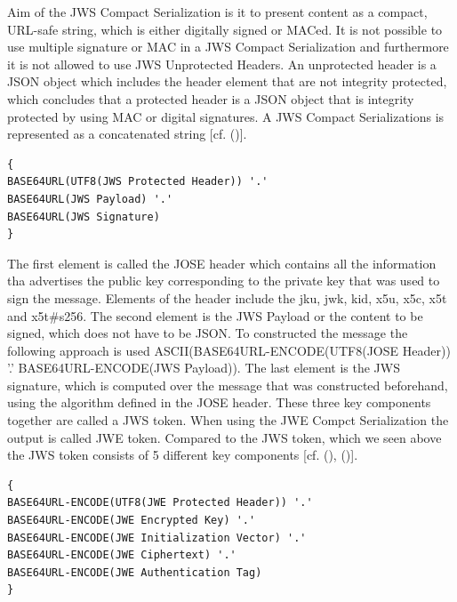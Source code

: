 {{{Aim of the JWS Compact Serialization is it to present content as a compact, URL-safe string, which is either digitally signed or MACed. It is not possible to use multiple signature or MAC in a JWS Compact Serialization and furthermore it is not allowed to use JWS Unprotected Headers. An unprotected header is a JSON object which includes the header element that are not integrity protected, which concludes that a protected header is a JSON object that is integrity protected by using MAC or digital signatures. A JWS Compact Serializations is represented as a concatenated string [cf. (\cite{JWS:IETF:Jones:2015})].

\begin{lstlisting}
{
BASE64URL(UTF8(JWS Protected Header)) '.'
BASE64URL(JWS Payload) '.'
BASE64URL(JWS Signature)
}
\end{lstlisting}

The first element is called the JOSE header which contains all the information tha advertises the public key corresponding to the private key that was used to sign the message. Elements of the header include the jku, jwk, kid, x5u, x5c, x5t and x5t\#s256. The second element is the JWS Payload or the content to be signed, which does not have to be JSON. To constructed the message the following approach is used  ASCII(BASE64URL-ENCODE(UTF8(JOSE Header)) '.' BASE64URL-ENCODE(JWS Payload)). 
The last element is the JWS signature, which is computed over the message that was constructed beforehand, using the algorithm defined in the JOSE header. These three key components together are called a JWS token. When using the JWE Compct Serialization the output is called JWE token. Compared to the JWS token, which we seen above the JWS token consists of 5 different key components [cf. (\cite{JWS:IETF:Jones:2015}), (\cite{JWE:IETF:Jones:2015})].


\begin{lstlisting}
{
BASE64URL-ENCODE(UTF8(JWE Protected Header)) '.'
BASE64URL-ENCODE(JWE Encrypted Key) '.'
BASE64URL-ENCODE(JWE Initialization Vector) '.'
BASE64URL-ENCODE(JWE Ciphertext) '.'
BASE64URL-ENCODE(JWE Authentication Tag)
}
\end{lstlisting}

}}}
